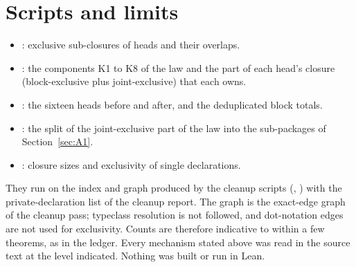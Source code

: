 \documentclass[11pt]{article}
\theoremstyle{definition}
\theoremstyle{remark}
\begin{document}
\appendix
\section{Scripts and limits}
\begin{itemize}[leftmargin=*,itemsep=1pt]
\item {}: exclusive sub-closures of heads and their overlaps.
\item {}: the components K1 to K8 of the law and the part of each head's closure (block-exclusive plus joint-exclusive) that each owns.
\item {}: the sixteen heads before and after, and the deduplicated block totals.
\item {}: the split of the joint-exclusive part of the law into the sub-packages of Section~\ref{sec:A1}.
\item {}: closure sizes and exclusivity of single declarations.
\end{itemize}
They run on the index and graph produced by the cleanup scripts (, ) with the private-declaration list of the cleanup report. The graph is the exact-edge graph of the cleanup pass; typeclass resolution is not followed, and dot-notation edges are not used for exclusivity. Counts are therefore indicative to within a few theorems, as in the ledger. Every mechanism stated above was read in the source text at the level indicated. Nothing was built or run in Lean.
\end{document}
